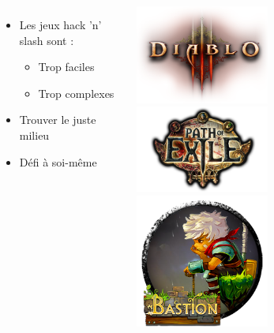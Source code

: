 \documentclass{beamer}
\begin{document}
\begin{frame}
\begin{columns}
\begin{itemize}
	\item Les jeux hack 'n' slash sont :
	\begin{itemize}
		\item Trop faciles
		\item Trop complexes
	\end{itemize}
	\item Trouver le juste milieu
	\item Défi à soi-même
\end{itemize}
\begin{center}
\includegraphics[width=0.5\textwidth]{img/pres_diablo3.png}\\
\includegraphics[width=0.5\textwidth]{img/pres_poe.png}\\
\includegraphics[width=0.5\textwidth]{img/pres_bastion.png}
\end{center}
\end{columns}
\end{frame}
\end{document}
